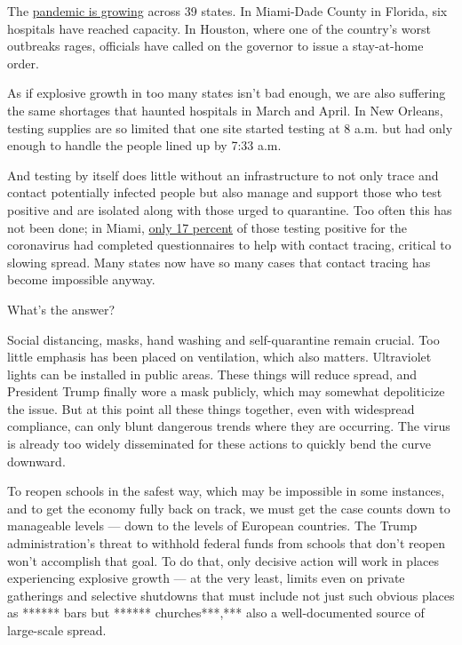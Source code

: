 The
\href{https://www.nytimes.com/interactive/2020/us/coronavirus-us-cases.html}{pandemic
is growing} across 39 states. In Miami-Dade County in Florida, six
hospitals have reached capacity. In Houston, where one of the country's
worst outbreaks rages, officials have called on the governor to issue a
stay-at-home order.

As if explosive growth in too many states isn't bad enough, we are also
suffering the same shortages that haunted hospitals in March and April.
In New Orleans, testing supplies are so limited that one site started
testing at 8 a.m. but had only enough to handle the people lined up by
7:33 a.m.

And testing by itself does little without an infrastructure to not only
trace and contact potentially infected people but also manage and
support those who test positive and are isolated along with those urged
to quarantine. Too often this has not been done; in Miami,
\href{https://miami.cbslocal.com/2020/07/09/mayors-coalition-wants-more-contact-tracers-miami-dade-county/}{only
17 percent} of those testing positive for the coronavirus had completed
questionnaires to help with contact tracing, critical to slowing spread.
Many states now have so many cases that contact tracing has become
impossible anyway.

What's the answer?

Social distancing, masks, hand washing and self-quarantine remain
crucial. Too little emphasis has been placed on ventilation, which also
matters. Ultraviolet lights can be installed in public areas. These
things will reduce spread, and President Trump finally wore a mask
publicly, which may somewhat depoliticize the issue. But at this point
all these things together, even with widespread compliance, can only
blunt dangerous trends where they are occurring. The virus is already
too widely disseminated for these actions to quickly bend the curve
downward.

To reopen schools in the safest way, which may be impossible in some
instances, and to get the economy fully back on track, we must get the
case counts down to manageable levels --- down to the levels of European
countries. The Trump administration's threat to withhold federal funds
from schools that don't reopen won't accomplish that goal. To do that,
only decisive action will work in places experiencing explosive growth
--- at the very least, limits even on private gatherings and selective
shutdowns that must include not just such obvious places as ****** bars
but ****** churches***,*** also a well-documented source of large-scale
spread.

